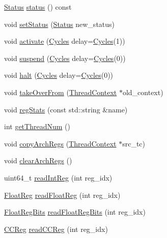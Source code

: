 \begin{DoxyCompactItemize}
\item 
\hyperlink{classThreadContext_a67a0db04d321a74b7e7fcfd3f1a3f70b}{Status} \hyperlink{classInOrderThreadContext_a2ad9e92a82d6f783b3061584729c2f4a}{status} () const 
\item 
void \hyperlink{classInOrderThreadContext_acdf331c877974ed8697216475a21998d}{setStatus} (\hyperlink{classThreadContext_a67a0db04d321a74b7e7fcfd3f1a3f70b}{Status} new\_\-status)
\item 
void \hyperlink{classInOrderThreadContext_ab542a5cf9ce4b41042d61e42dfe3aeab}{activate} (\hyperlink{classCycles}{Cycles} delay=\hyperlink{classCycles}{Cycles}(1))
\item 
void \hyperlink{classInOrderThreadContext_a32072550286c5735b4b95349efa8e4f6}{suspend} (\hyperlink{classCycles}{Cycles} delay=\hyperlink{classCycles}{Cycles}(0))
\item 
void \hyperlink{classInOrderThreadContext_ade40686c5cdae8911d4062b9bf3d5340}{halt} (\hyperlink{classCycles}{Cycles} delay=\hyperlink{classCycles}{Cycles}(0))
\item 
void \hyperlink{classInOrderThreadContext_af121f4812cba8e37d675cddada8e47ed}{takeOverFrom} (\hyperlink{classThreadContext}{ThreadContext} $\ast$old\_\-context)
\item 
void \hyperlink{classInOrderThreadContext_a3dd3443357312bcb75580eaa508c48a4}{regStats} (const std::string \&name)
\item 
int \hyperlink{classInOrderThreadContext_a97f81432e1b0b5bcfcf87a7fb6b03e17}{getThreadNum} ()
\item 
void \hyperlink{classInOrderThreadContext_a60ea17de8baed42e666abb02b172c111}{copyArchRegs} (\hyperlink{classThreadContext}{ThreadContext} $\ast$src\_\-tc)
\item 
void \hyperlink{classInOrderThreadContext_ad5c88ea41846742bd8c70d9c50f31945}{clearArchRegs} ()
\item 
uint64\_\-t \hyperlink{classInOrderThreadContext_a21c850cd41ab977a2cf3450fe66ec25a}{readIntReg} (int reg\_\-idx)
\item 
\hyperlink{classThreadContext_a75484259f1855aabc8d74c6eb1cfe186}{FloatReg} \hyperlink{classInOrderThreadContext_a2f97d83baef4fbda00b7f7f62779752f}{readFloatReg} (int reg\_\-idx)
\item 
\hyperlink{classThreadContext_aab5eeae86499f9bfe15ef79360eccc64}{FloatRegBits} \hyperlink{classInOrderThreadContext_a4998e6615f835676762af364eff198e3}{readFloatRegBits} (int reg\_\-idx)
\item 
\hyperlink{classThreadContext_a0c9de550a32808e6a25b54b6c791d5ab}{CCReg} \hyperlink{classInOrderThreadContext_ac3d147c535052bfb1f8e8fe0697168d7}{readCCReg} (int reg\_\-idx)

\end{DoxyCompactItemize}
